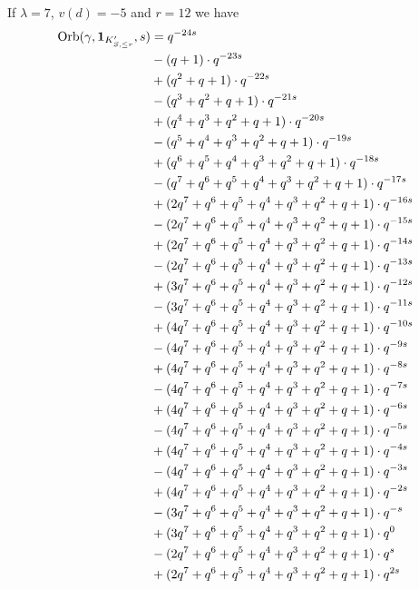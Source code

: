 \begin{example}
  If $\lambda = 7$, $v(d) = -5$ and $r = 12$ we have
  \begin{align*}
    \Orb(\gamma, \mathbf{1}_{K'_{S, \le r}}, s)
    &= q^{-24s} \\
    &- (q+1) \cdot q^{-23s} \\
    &+ (q^2+q+1) \cdot q^{-22s} \\
    &- (q^3+q^2+q+1) \cdot q^{-21s} \\
    &+ (q^4+q^3+q^2+q+1) \cdot q^{-20s} \\
    &- (q^5+q^4+q^3+q^2+q+1) \cdot q^{-19s} \\
    &+ (q^6+q^5+q^4+q^3+q^2+q+1) \cdot q^{-18s} \\
    &- (q^7+q^6+q^5+q^4+q^3+q^2+q+1) \cdot q^{-17s} \\
    &+ (2q^7+q^6+q^5+q^4+q^3+q^2+q+1) \cdot q^{-16s} \\
    &- (2q^7+q^6+q^5+q^4+q^3+q^2+q+1) \cdot q^{-15s} \\
    &+ (2q^7+q^6+q^5+q^4+q^3+q^2+q+1) \cdot q^{-14s} \\
    &- (2q^7+q^6+q^5+q^4+q^3+q^2+q+1) \cdot q^{-13s} \\
    &+ (3q^7+q^6+q^5+q^4+q^3+q^2+q+1) \cdot q^{-12s} \\
    &- (3q^7+q^6+q^5+q^4+q^3+q^2+q+1) \cdot q^{-11s} \\
    &+ (4q^7+q^6+q^5+q^4+q^3+q^2+q+1) \cdot q^{-10s} \\
    &- (4q^7+q^6+q^5+q^4+q^3+q^2+q+1) \cdot q^{-9s} \\
    &+ (4q^7+q^6+q^5+q^4+q^3+q^2+q+1) \cdot q^{-8s} \\
    &- (4q^7+q^6+q^5+q^4+q^3+q^2+q+1) \cdot q^{-7s} \\
    &+ (4q^7+q^6+q^5+q^4+q^3+q^2+q+1) \cdot q^{-6s} \\
    &- (4q^7+q^6+q^5+q^4+q^3+q^2+q+1) \cdot q^{-5s} \\
    &+ (4q^7+q^6+q^5+q^4+q^3+q^2+q+1) \cdot q^{-4s} \\
    &- (4q^7+q^6+q^5+q^4+q^3+q^2+q+1) \cdot q^{-3s} \\
    &+ (4q^7+q^6+q^5+q^4+q^3+q^2+q+1) \cdot q^{-2s} \\
    &- (3q^7+q^6+q^5+q^4+q^3+q^2+q+1) \cdot q^{-s} \\
    &+ (3q^7+q^6+q^5+q^4+q^3+q^2+q+1) \cdot q^{0} \\
    &- (2q^7+q^6+q^5+q^4+q^3+q^2+q+1) \cdot q^{s} \\
    &+ (2q^7+q^6+q^5+q^4+q^3+q^2+q+1) \cdot q^{2s} \\

\end{align*}
\end{example}
